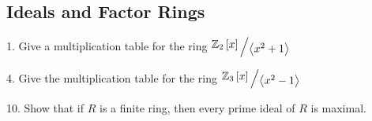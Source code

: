 \subsection{Ideals and Factor Rings}
\begin{mdframed}[style=darkQuesion]
  1. Give a multiplication table for the ring $\bigslant{\Zm{2}\lrb{x}}{\lra{x^2+1}}$
\end{mdframed}
\begin{mdframed}[style=darkAnswer,frametitle={Joe Starr}]
\end{mdframed}
\newpage
\begin{mdframed}[style=darkQuesion]
 4. Give the multiplication table for the ring $\bigslant{\Zm{3}\lrb{x}}{\lra{x^2-1}}$
\end{mdframed}
\begin{mdframed}[style=darkAnswer,frametitle={Joe Starr}]
\end{mdframed}
\newpage
\begin{mdframed}[style=darkQuesion]
 10. Show that if $R$ is a finite ring, then every prime ideal of $R$ is maximal.
\end{mdframed}
\begin{mdframed}[style=darkAnswer,frametitle={Joe Starr}]
\end{mdframed}
